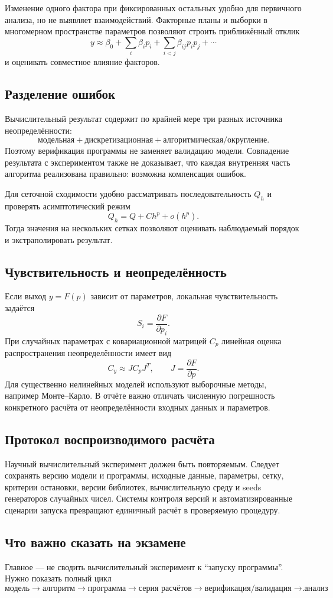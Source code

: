 Изменение одного фактора при фиксированных остальных удобно для первичного
анализа, но не выявляет взаимодействий. Факторные планы и выборки в
многомерном пространстве параметров позволяют строить приближённый отклик
\[
y\approx \beta_0+\sum_i\beta_ip_i+\sum_{i<j}\beta_{ij}p_ip_j+\cdots
\]
и оценивать совместное влияние факторов.

\subsection{Разделение ошибок}

Вычислительный результат содержит по крайней мере три разных источника
неопределённости:
\[
\text{модельная} + \text{дискретизационная} + \text{алгоритмическая/округление}.
\]
Поэтому верификация программы не заменяет валидацию модели. Совпадение
результата с экспериментом также не доказывает, что каждая внутренняя часть
алгоритма реализована правильно: возможна компенсация ошибок.

Для сеточной сходимости удобно рассматривать последовательность $Q_h$ и
проверять асимптотический режим
\[
Q_h=Q+C h^p+o(h^p).
\]
Тогда значения на нескольких сетках позволяют оценивать наблюдаемый порядок и
экстраполировать результат.

\subsection{Чувствительность и неопределённость}

Если выход $y=F(p)$ зависит от параметров, локальная чувствительность задаётся
\[
S_i=\frac{\partial F}{\partial p_i}.
\]
При случайных параметрах с ковариационной матрицей $C_p$ линейная оценка
распространения неопределённости имеет вид
\[
C_y\approx J C_pJ^T,
\qquad J=\frac{\partial F}{\partial p}.
\]
Для существенно нелинейных моделей используют выборочные методы, например
Монте--Карло. В отчёте важно отличать численную погрешность конкретного расчёта
от неопределённости входных данных и параметров.

\subsection{Протокол воспроизводимого расчёта}

Научный вычислительный эксперимент должен быть повторяемым. Следует сохранять
версию модели и программы, исходные данные, параметры, сетку, критерии остановки,
версии библиотек, вычислительную среду и seeds генераторов случайных чисел.
Системы контроля версий и автоматизированные сценарии запуска превращают
единичный расчёт в проверяемую процедуру.


\subsection{Что важно сказать на экзамене}

Главное --- не сводить вычислительный эксперимент к ``запуску программы''. Нужно показать полный цикл
\[
\boxed{
\text{модель}
\rightarrow
\text{алгоритм}
\rightarrow
\text{программа}
\rightarrow
\text{серия расчётов}
\rightarrow
\text{верификация/валидация}
\rightarrow
\text{анализ}}.
\]

\newpage

